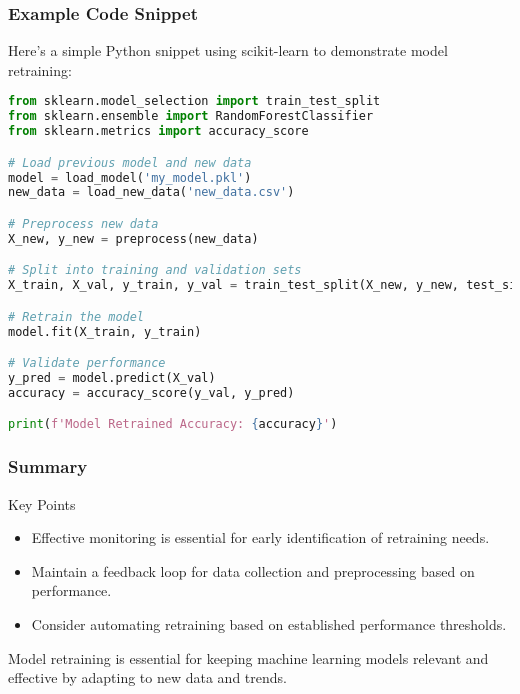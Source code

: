 \documentclass[aspectratio=169]{beamer}
\begin{document}
\begin{frame}[fragile]
    \frametitle{Example Code Snippet}
    Here’s a simple Python snippet using scikit-learn to demonstrate model retraining:
    \begin{lstlisting}[language=Python]
from sklearn.model_selection import train_test_split
from sklearn.ensemble import RandomForestClassifier
from sklearn.metrics import accuracy_score

# Load previous model and new data
model = load_model('my_model.pkl')
new_data = load_new_data('new_data.csv')

# Preprocess new data
X_new, y_new = preprocess(new_data)

# Split into training and validation sets
X_train, X_val, y_train, y_val = train_test_split(X_new, y_new, test_size=0.2)

# Retrain the model
model.fit(X_train, y_train)

# Validate performance
y_pred = model.predict(X_val)
accuracy = accuracy_score(y_val, y_pred)

print(f'Model Retrained Accuracy: {accuracy}')
    \end{lstlisting}
\end{frame}

\begin{frame}[fragile]
    \frametitle{Summary}
    \begin{block}{Key Points}
        \begin{itemize}
            \item Effective monitoring is essential for early identification of retraining needs.
            \item Maintain a feedback loop for data collection and preprocessing based on performance.
            \item Consider automating retraining based on established performance thresholds.
        \end{itemize}
    \end{block}
    Model retraining is essential for keeping machine learning models relevant and effective by adapting to new data and trends.
\end{frame}
\end{document}
